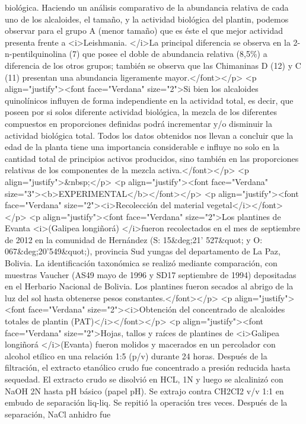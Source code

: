 biológica. Haciendo un análisis comparativo de la abundancia relativa de cada
uno de los alcaloides, el tamaño, y la actividad biológica del plantin, podemos
observar para el grupo A (menor tamaño) que es éste el que mejor actividad
presenta frente a <i>Leishmania. </i>La principal diferencia se observa en la
2-n-pentilquinolina (7) que posee el doble de abundancia relativa (8,5\%) a
diferencia de los otros grupos; también se observa que las Chimaninas D (12) y C
(11) presentan una abundancia ligeramente mayor.</font></p> <p
align="justify"><font face="Verdana" size="2">Si bien los alcaloides
quinolínicos influyen de forma independiente en la actividad total, es decir,
que poseen por si solos diferente actividad biológica, la mezcla de los
diferentes compuestos en proporciones definidas podrá incrementar y/o disminuir
la actividad biológica total. Todos los datos obtenidos nos llevan a concluir
que la edad de la planta tiene una importancia considerable e influye no solo en
la cantidad total de principios activos producidos, sino también en las
proporciones relativas de los componentes de la mezcla activa.</font></p> <p
align="justify">\&nbsp;</p> <p align="justify"><font face="Verdana"
size="3"><b>EXPERIMENTAL</b></font></p> <p align="justify"><font face="Verdana"
size="2"><i>Recolección del material vegetal</i></font></p> <p
align="justify"><font face="Verdana" size="2">Los plantines de Evanta
<i>(Galipea longiñorá) </i>fueron recolectados en el mes de septiembre de 2012
en la comunidad de Hernández (S: 15\&deg;21' 527\&quot; y O:
067\&deg;20'549\&quot;), provincia Sud yungas del departamento de La Paz,
Bolivia. La identificación taxonómica se realizó mediante comparación, con
muestras Vaucher (AS49 mayo de 1996 y SD17 septiembre de 1994) depositadas en el
Herbario Nacional de Bolivia. Los plantines fueron secados al abrigo de la luz
del sol hasta obtenerse pesos constantes.</font></p> <p align="justify"><font
face="Verdana" size="2"><i>Obtención del concentrado de alcaloides totales de
plantin (PAT)</i></font></p> <p align="justify"><font face="Verdana"
size="2">Hojas, tallos y raíces de plantines de <i>Galipea longiñorá
</i>(Evanta) fueron molidos y macerados en un percolador con alcohol etílico en
una relación 1:5 (p/v) durante 24 horas. Después de la filtración, el extracto
etanólico crudo fue concentrado a presión reducida hasta sequedad. El extracto
crudo se disolvió en HCL, 1N y luego se alcalinizó con NaOH 2N hasta pH básico
(papel pH). Se extrajo contra CH2CI2 v/v 1:1 en embudo de separación liq-liq. Se
repitió la operación tres veces. Después de la separación, NaCl anhidro fue
